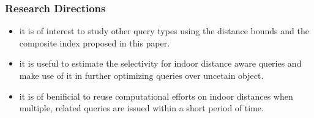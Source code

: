 
\begin{frame}
  \frametitle{Research Directions}

  \begin{itemize}
  	\item it is of interest to study other query types using the distance bounds and the composite index proposed in this paper.
    \item it is useful to estimate the selectivity for indoor distance aware queries and make use of it in further optimizing queries over uncetain object.
    \item it is of benificial to reuse computational efforts on indoor distances when multiple, related queries are issued within a short period of time.
  \end{itemize}

\end{frame}
